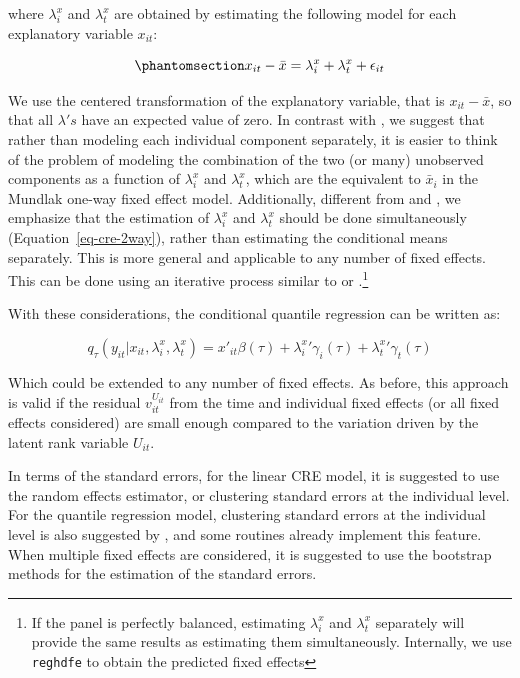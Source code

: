 \documentclass[bib]{statapress}
\begin{document}
where \(\lambda_i^x\) and \(\lambda_t^x\) are obtained by estimating the
following model for each explanatory variable \(x_{it}\):

\begin{equation}\phantomsection\label{eq-cre-2way}{x_{it} -\bar x = \lambda_i^x + \lambda_t^x + \epsilon_{it}
}\end{equation}

We use the centered transformation of the explanatory variable, that is
\(x_{it}-\bar x\), so that all \(\lambda's\) have an expected value of
zero. In contrast with \citet{baltagi2023}, we suggest that rather than
modeling each individual component separately, it is easier to think of
the problem of modeling the combination of the two (or many) unobserved
components as a function of \(\lambda_i^x\) and \(\lambda_t^x\), which
are the equivalent to \(\bar x_i\) in the Mundlak one-way fixed effect
model. Additionally, different from \citet{wooldridge2021} and
\citet{baltagi2023}, we emphasize that the estimation of \(\lambda_i^x\)
and \(\lambda_t^x\) should be done simultaneously
(Equation~\ref{eq-cre-2way}), rather than estimating the conditional
means separately. This is more general and applicable to any number of
fixed effects. This can be done using an iterative process similar to
\citet{rios2015} or \citet{correia_feasible_nodate}.\footnote{If the
  panel is perfectly balanced, estimating \(\lambda_i^x\) and
  \(\lambda_t^x\) separately will provide the same results as estimating
  them simultaneously. Internally, we use
  \citet{correia_feasible_nodate} \texttt{reghdfe} to obtain the
  predicted fixed effects}

With these considerations, the conditional quantile regression can be
written as:

\[q_\tau(y_{it}|x_{it},\lambda_i^x,\lambda_t^x)=x'_{it}\beta(\tau)+{\lambda^x_i}'\gamma_i(\tau)
+{\lambda^x_t}'\gamma_t(\tau)  
\]

Which could be extended to any number of fixed effects. As before, this
approach is valid if the residual \(v^{U_{it}}_{it}\) from the time and
individual fixed effects (or all fixed effects considered) are small
enough compared to the variation driven by the latent rank variable
\(U_{it}\).

In terms of the standard errors, for the linear CRE model, it is
suggested to use the random effects estimator, or clustering standard
errors at the individual level. For the quantile regression model,
clustering standard errors at the individual level is also suggested by
\citet{wooldridge2010}, and some routines already implement this
feature. When multiple fixed effects are considered, it is suggested to
use the bootstrap methods for the estimation of the standard errors.
\end{document}
